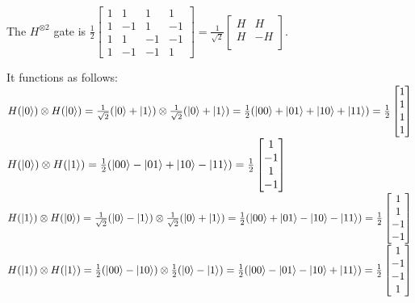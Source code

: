 \begin{definition}
    The $H^{\otimes 2}$ gate is $\frac{1}{2} \begin{bmatrix}
        1 & 1 & 1 & 1\\
        1 & -1 & 1 & -1\\
        1 & 1 & -1 & -1\\
        1 & -1 & -1 & 1
    \end{bmatrix} = \frac{1}{\sqrt{2}} \begin{bmatrix}
        H & H\\
        H & -H\\
    \end{bmatrix}$.

    It functions as follows:\\

    $H(\lvert0\rangle) \otimes H(\lvert0\rangle) = \frac{1}{\sqrt{2}} (\lvert0\rangle + \lvert1\rangle) \otimes \frac{1}{\sqrt{2}} (\lvert0\rangle + \lvert1\rangle) = \frac{1}{2} (\lvert00\rangle + \lvert01\rangle + \lvert10\rangle + \lvert11\rangle) = \frac{1}{2} \begin{bmatrix}
        1\\
        1\\
        1\\
        1
    \end{bmatrix}$\\
    
    $H(\lvert0\rangle) \otimes H(\lvert1\rangle) = \frac{1}{2} (\lvert00\rangle - \lvert01\rangle + \lvert10\rangle - \lvert11\rangle) = \frac{1}{2} \begin{bmatrix}
        1\\
        -1\\
        1\\
        -1
    \end{bmatrix}$\\
    
    $H(\lvert1\rangle) \otimes H(\lvert0\rangle) = \frac{1}{\sqrt{2}} (\lvert0\rangle - \lvert1\rangle) \otimes \frac{1}{\sqrt{2}} (\lvert0\rangle + \lvert1\rangle) = \frac{1}{2} (\lvert00\rangle + \lvert01\rangle - \lvert10\rangle - \lvert11\rangle) = \frac{1}{2} \begin{bmatrix}
        1\\
        1\\
        -1\\
        -1
    \end{bmatrix}$\\
    
    $H(\lvert1\rangle) \otimes H(\lvert1\rangle) = \frac{1}{2} (\lvert00\rangle - \lvert10\rangle) \otimes \frac{1}{2}(\lvert0\rangle - \lvert1\rangle) = \frac{1}{2}(\lvert00\rangle - \lvert01\rangle - \lvert10\rangle + \lvert11\rangle) = \frac{1}{2} \begin{bmatrix}
        1\\
        -1\\
        -1\\
        1
    \end{bmatrix}$\\
\end{definition}

